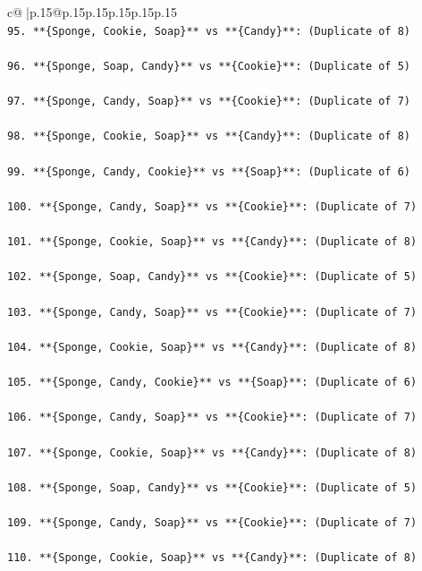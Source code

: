 \documentclass{article}
\begin{document}
{\begin{supertabular}{c@{$\;$}|p{.15\linewidth}@{}p{.15\linewidth}p{.15\linewidth}p{.15\linewidth}p{.15\linewidth}p{.15\linewidth}}
{{{\\ 
\texttt{95. **\{Sponge, Cookie, Soap\}** vs **\{Candy\}**: (Duplicate of 8)} \\
\\ 
\texttt{96. **\{Sponge, Soap, Candy\}** vs **\{Cookie\}**: (Duplicate of 5)} \\
\\ 
\texttt{97. **\{Sponge, Candy, Soap\}** vs **\{Cookie\}**: (Duplicate of 7)} \\
\\ 
\texttt{98. **\{Sponge, Cookie, Soap\}** vs **\{Candy\}**: (Duplicate of 8)} \\
\\ 
\texttt{99. **\{Sponge, Candy, Cookie\}** vs **\{Soap\}**: (Duplicate of 6)} \\
\\ 
\texttt{100. **\{Sponge, Candy, Soap\}** vs **\{Cookie\}**: (Duplicate of 7)} \\
\\ 
\texttt{101. **\{Sponge, Cookie, Soap\}** vs **\{Candy\}**: (Duplicate of 8)} \\
\\ 
\texttt{102. **\{Sponge, Soap, Candy\}** vs **\{Cookie\}**: (Duplicate of 5)} \\
\\ 
\texttt{103. **\{Sponge, Candy, Soap\}** vs **\{Cookie\}**: (Duplicate of 7)} \\
\\ 
\texttt{104. **\{Sponge, Cookie, Soap\}** vs **\{Candy\}**: (Duplicate of 8)} \\
\\ 
\texttt{105. **\{Sponge, Candy, Cookie\}** vs **\{Soap\}**: (Duplicate of 6)} \\
\\ 
\texttt{106. **\{Sponge, Candy, Soap\}** vs **\{Cookie\}**: (Duplicate of 7)} \\
\\ 
\texttt{107. **\{Sponge, Cookie, Soap\}** vs **\{Candy\}**: (Duplicate of 8)} \\
\\ 
\texttt{108. **\{Sponge, Soap, Candy\}** vs **\{Cookie\}**: (Duplicate of 5)} \\
\\ 
\texttt{109. **\{Sponge, Candy, Soap\}** vs **\{Cookie\}**: (Duplicate of 7)} \\
\\ 
\texttt{110. **\{Sponge, Cookie, Soap\}** vs **\{Candy\}**: (Duplicate of 8)} \\
}}}
\end{supertabular}}
\end{document}
